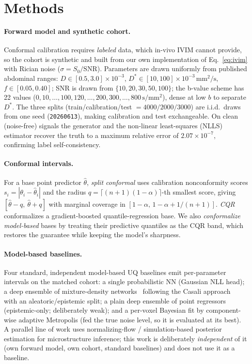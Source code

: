 \documentclass[11pt]{article}
\newcommand{\Dstar}{D^{*}}
\newcommand{\unit}[1]{\,\mathrm{#1}}
\begin{document}
\section{Methods}
\label{sec:methods}

\paragraph{Forward model and synthetic cohort.}
Conformal calibration requires \emph{labeled} data, which in-vivo IVIM cannot
provide, so the cohort is synthetic and built from our own implementation of
Eq.~\eqref{eq:ivim} with Rician noise ($\sigma = S_0/\mathrm{SNR}$). Parameters are
drawn uniformly from published abdominal ranges: $D\in[0.5,3.0]\times10^{-3}$,
$\Dstar\in[10,100]\times10^{-3}\unit{mm^2/s}$, $f\in[0.05,0.40]$; SNR is drawn from
$\{10,20,30,50,100\}$; the b-value scheme has 22 values
($0,10,\dots,100,120,\dots,200,300,\dots,800\unit{s/mm^2}$), dense at low $b$ to
separate $\Dstar$. The three splits (train/calibration/test $=4000/2000/3000$) are
i.i.d.\ draws from one seed (\texttt{20260613}), making calibration and test
exchangeable. On clean (noise-free) signals the generator and the non-linear
least-squares (NLLS) estimator recover the truth to a maximum relative error of
$2.07\times10^{-7}$, confirming label self-consistency.

\paragraph{Conformal intervals.}
For a base point predictor $\hat\theta$, \emph{split conformal} uses calibration
nonconformity scores $s_i = |\theta_i - \hat\theta_i|$ and the radius
$q=\lceil(n{+}1)(1-\alpha)\rceil$-th smallest score, giving
$[\hat\theta - q,\ \hat\theta + q]$ with marginal coverage in
$[1-\alpha,\,1-\alpha+1/(n{+}1)]$. \emph{CQR}~\citep{romano2019} conformalizes a
gradient-boosted quantile-regression base. We also \emph{conformalize model-based}
bases by treating their predictive quantiles as the CQR band, which restores the
guarantee while keeping the model's sharpness.

\paragraph{Model-based baselines.}
Four standard, independent model-based UQ baselines emit per-parameter intervals on
the matched cohort: a single probabilistic NN (Gaussian NLL head); a deep ensemble
of mixture-density networks~\citep{bishop1994,lakshminarayanan2017} following the
Casali approach~\citep{casali2026} with an aleatoric/epistemic split; a plain deep
ensemble of point regressors (epistemic-only; deliberately weak); and a per-voxel
Bayesian fit by component-wise adaptive Metropolis (fed the true noise level, so it
is evaluated at its best). A parallel line of work uses normalizing-flow /
simulation-based posterior estimation for microstructure inference; this work is
deliberately \emph{independent} of it (own forward model, own cohort, standard
baselines) and does not use it as a baseline.
\end{document}
